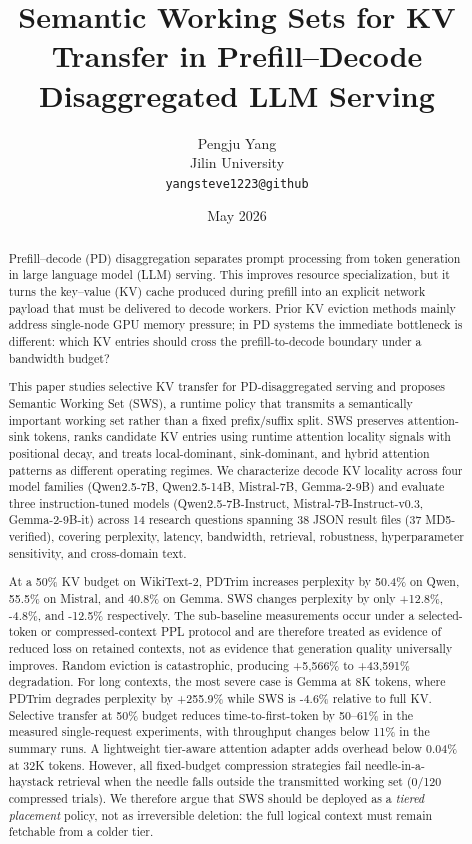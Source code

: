 \documentclass[11pt]{article}
\title{Semantic Working Sets for KV Transfer in Prefill--Decode Disaggregated LLM Serving}
\author{Pengju Yang\\
Jilin University\\
\texttt{yangsteve1223@github}}
\date{May 2026}
\newcommand{\method}{SWS}
\newcommand{\fullmethod}{Semantic Working Set}
\newcommand{\pct}{\%}
\theoremstyle{definition}
\theoremstyle{plain}
\begin{document}
\maketitle

\begin{abstract}
Prefill--decode (PD) disaggregation separates prompt processing from token generation in large language model (LLM) serving.  This improves resource specialization, but it turns the key--value (KV) cache produced during prefill into an explicit network payload that must be delivered to decode workers.  Prior KV eviction methods mainly address single-node GPU memory pressure; in PD systems the immediate bottleneck is different: which KV entries should cross the prefill-to-decode boundary under a bandwidth budget?

This paper studies selective KV transfer for PD-disaggregated serving and proposes \fullmethod{} (\method{}), a runtime policy that transmits a semantically important working set rather than a fixed prefix/suffix split.  \method{} preserves attention-sink tokens, ranks candidate KV entries using runtime attention locality signals with positional decay, and treats local-dominant, sink-dominant, and hybrid attention patterns as different operating regimes.  We characterize decode KV locality across four model families (Qwen2.5-7B, Qwen2.5-14B, Mistral-7B, Gemma-2-9B) and evaluate three instruction-tuned models (Qwen2.5-7B-Instruct, Mistral-7B-Instruct-v0.3, Gemma-2-9B-it) across 14 research questions spanning 38 JSON result files (37 MD5-verified), covering perplexity, latency, bandwidth, retrieval, robustness, hyperparameter sensitivity, and cross-domain text.

At a 50\pct{} KV budget on WikiText-2, PDTrim increases perplexity by 50.4\pct{} on Qwen, 55.5\pct{} on Mistral, and 40.8\pct{} on Gemma.  \method{} changes perplexity by only +12.8\pct{}, -4.8\pct{}, and -12.5\pct{} respectively.  The sub-baseline measurements occur under a selected-token or compressed-context PPL protocol and are therefore treated as evidence of reduced loss on retained contexts, not as evidence that generation quality universally improves.  Random eviction is catastrophic, producing +5{,}566\pct{} to +43{,}591\pct{} degradation.  For long contexts, the most severe case is Gemma at 8K tokens, where PDTrim degrades perplexity by +255.9\pct{} while \method{} is -4.6\pct{} relative to full KV.  Selective transfer at 50\pct{} budget reduces time-to-first-token by 50--61\pct{} in the measured single-request experiments, with throughput changes below 11\pct{} in the summary runs.  A lightweight tier-aware attention adapter adds overhead below 0.04\pct{} at 32K tokens.  However, all fixed-budget compression strategies fail needle-in-a-haystack retrieval when the needle falls outside the transmitted working set (0/120 compressed trials).  We therefore argue that \method{} should be deployed as a \emph{tiered placement} policy, not as irreversible deletion: the full logical context must remain fetchable from a colder tier.
\end{abstract}
\end{document}

